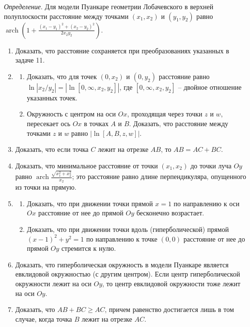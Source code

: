 	\textit{Определение}. Для модели Пуанкаре геометрии Лобачевского в верхней полуплоскости расстояние между точками $(x_1, x_2)$ и $(y_1, y_2)$ равно $\operatorname{arch} \left(1 + \frac{(x_1 - y_1)^2 + (x_2 - y_2)^2}{2 x_2 y_2}\right)$.
	\begin{enumerate}[resume*]
		\item Доказать, что расстояние сохраняется при преобразованиях указанных в задаче 11.
		\item
		\begin{enumerate}
			\item Доказать, что для точек $(0, x_2)$ и $(0, y_2)$ расстояние равно $\ln |x_2 / y_2| = |\ln[0, \infty, x_2, y_2 ]|$, где $[0, \infty, x_2, y_2]$ -- двойное отношение указанных точек.

			\item Окружность с центром на оси $Ox$, проходящая через точки $z$ и $w$, пересекает ось $Ox$ в точках $A$ и $B$. Доказать, что расстояние между точками $z$ и $w$ равно $|\ln [A, B, z, w]|$.
		\end{enumerate}
		\item Доказать, что если точка $C$ лежит на отрезке $AB$, то $AB = AC + BC$.

		\item Доказать, что минимальное расстояние от точки $(x_1, x_2)$ до точки луча $Oy$ равно $\operatorname{arch} \frac{\sqrt{x_1^2 + x_2^2}}{x_2}$; это расстояние равно длине перпендикуляра, опущенного из точки на прямую.

		\item 
		\begin{enumerate}
			\item Доказать, что при движении точки прямой $x=1$ по направлению к оси $Ox$ расстояние от нее до прямой $Oy$ бесконечно возрастает.

			\item Доказать, что при движении точки вдоль (гиперболической) прямой $(x-1)^2 + y^2 = 1$ по направлению к точке $(0,0)$ расстояние от нее до прямой $Oy$ стремится к нулю.

		\end{enumerate}
		\item Доказать, что гиперболическая окружность в модели Пуанкаре является евклидовой окружностью (с другим центром). Если центр гиперболической окружности лежит на оси $Oy$, то центр евклидовой окружности тоже лежит на оси $Oy$.
		\item Доказать, что $AB + BC \ge AC$, причем равенство достигается лишь в том случае, когда точка $B$ лежит на отрезке $AC$.


\end{enumerate}
